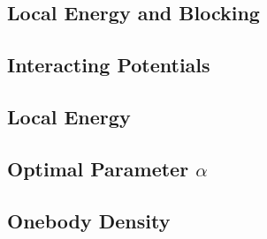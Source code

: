 \subsection{Local Energy and Blocking}

\subsection{Interacting Potentials}
\subsection{Local Energy}
\subsection{Optimal Parameter \(\alpha\)}
\subsection{Onebody Density}

